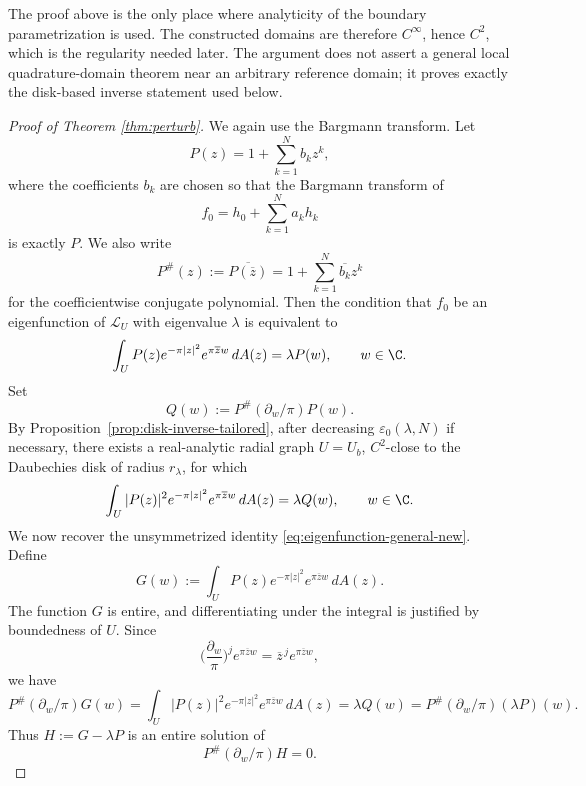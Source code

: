 \begin{remark}
The proof above is the only place where analyticity of the boundary
parametrization is used. The constructed domains are therefore \(C^\infty\),
hence \(C^2\), which is the regularity needed later. The argument does not
assert a general local quadrature-domain theorem near an arbitrary reference
domain; it proves exactly the disk-based inverse statement used below.
\end{remark}

\begin{proof}[Proof of Theorem \ref{thm:perturb}]
We again use the Bargmann transform. Let
\[
P(z)=1+\sum_{k=1}^N b_k z^k,
\]
where the coefficients $b_k$ are chosen so that the Bargmann transform of
\[
f_0=h_0+\sum_{k=1}^N a_k h_k
\]
is exactly $P$. We also write
\[
P^\#(z):=\overline{P(\overline z)}
=1+\sum_{k=1}^N \overline{b_k}z^k
\]
for the coefficientwise conjugate polynomial. Then the condition that $f_0$ be an eigenfunction of $\mathcal{L}_U$ with eigenvalue $\lambda$ is equivalent to
\begin{equation}\label{eq:eigenfunction-general-new}
\int_U P(z)e^{-\pi|z|^2}e^{\pi \overline z w}\,dA(z)=\lambda P(w),
\qquad w\in \C.
\end{equation}
Set
\[
Q(w):=P^\#(\partial_w/\pi)P(w).
\]
By Proposition~\ref{prop:disk-inverse-tailored}, after decreasing
\(\varepsilon_0(\lambda,N)\) if necessary, there exists a real-analytic radial
graph \(U=U_b\), \(C^2\)-close to the Daubechies disk of radius
\(r_\lambda\), for which
\begin{equation}\label{eq:almost-reduced-new}
\int_U |P(z)|^2e^{-\pi|z|^2}e^{\pi\overline z w}\,dA(z)
=
\lambda Q(w),
\qquad w\in\C .
\end{equation}
We now recover the unsymmetrized identity
\eqref{eq:eigenfunction-general-new}. Define
\[
G(w):=\int_U P(z)e^{-\pi|z|^2}e^{\pi\overline z w}\,dA(z).
\]
The function \(G\) is entire, and differentiating under the integral is
justified by boundedness of \(U\). Since
\[
\Big(\frac{\partial_w}{\pi}\Big)^j e^{\pi\overline z w}
=\overline z^{\,j}e^{\pi\overline z w},
\]
we have
\[
P^\#(\partial_w/\pi)G(w)
=
\int_U |P(z)|^2e^{-\pi|z|^2}e^{\pi\overline z w}\,dA(z)
=
\lambda Q(w)
=
P^\#(\partial_w/\pi)(\lambda P)(w).
\]
Thus \(H:=G-\lambda P\) is an entire solution of
\[
P^\#(\partial_w/\pi)H=0.
\]


\end{proof}
